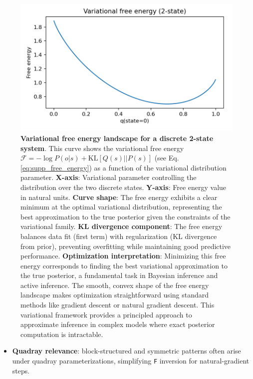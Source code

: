 \documentclass[
  10pt,
]{article}
\newcommand{\passthrough}[1]{#1}
\providecommand{\tightlist}{%
  \setlength{\itemsep}{0pt}\setlength{\parskip}{0pt}}
\begin{document}
\begin{figure}
\centering
\includegraphics{../output/figures/free_energy_curve.png}
\caption{\textbf{Variational free energy landscape for a discrete
2-state system}. This curve shows the variational free energy
\(\mathcal{F} = -\log P(o|s) + \text{KL}[Q(s)||P(s)]\) (see Eq.
\eqref{eq:supp_free_energy}) as a function of the variational
distribution parameter. \textbf{X-axis}: Variational parameter
controlling the distribution over the two discrete states.
\textbf{Y-axis}: Free energy value in natural units. \textbf{Curve
shape}: The free energy exhibits a clear minimum at the optimal
variational distribution, representing the best approximation to the
true posterior given the constraints of the variational family.
\textbf{KL divergence component}: The free energy balances data fit
(first term) with regularization (KL divergence from prior), preventing
overfitting while maintaining good predictive performance.
\textbf{Optimization interpretation}: Minimizing this free energy
corresponds to finding the best variational approximation to the true
posterior, a fundamental task in Bayesian inference and active
inference. The smooth, convex shape of the free energy landscape makes
optimization straightforward using standard methods like gradient
descent or natural gradient descent. This variational framework provides
a principled approach to approximate inference in complex models where
exact posterior computation is intractable.}
\end{figure}

\begin{itemize}
\tightlist
\item
  \textbf{Quadray relevance}: block-structured and symmetric patterns
  often arise under quadray parameterizations, simplifying
  \passthrough{\lstinline!F!} inversion for natural-gradient steps.
\end{itemize}
\end{document}
